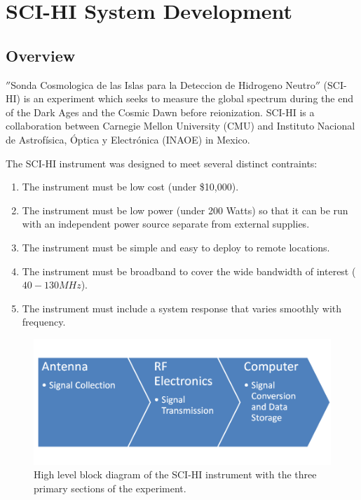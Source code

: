 \chapter{SCI-HI System Development}\label{Ch:System}



\section{Overview} \label{Sec:sysover}

$''$Sonda Cosmologica de las Islas para la Deteccion de Hidrogeno Neutro$''$ (SCI-HI) is an experiment which seeks to measure the \cm global spectrum during the end of the Dark Ages and the Cosmic Dawn before reionization. SCI-HI is a collaboration between Carnegie Mellon University (CMU) and Instituto Nacional de Astrof\'{i}sica, \'{O}ptica y Electr\'{o}nica (INAOE) in Mexico.  

The SCI-HI instrument was designed to meet several distinct contraints:

\begin{enumerate}
\item The instrument must be low cost (under \$10,000).

\item The instrument must be low power (under  200 Watts) so that it can be run with an independent power source separate from external supplies. 

\item The instrument must be simple and easy to deploy to remote locations. 

\item The instrument must be broadband to cover the wide bandwidth of interest ($40-130 MHz$).

\item The instrument must include a system response that varies smoothly with frequency. 

\end{enumerate}

\begin{figure}[bht]
\begin{center}
\includegraphics[width=0.9\linewidth]{SCIHI_system/figures/basic_block_diagram.png}
\caption{High level block diagram of the SCI-HI instrument with the three primary sections of the experiment. }
\label{Fig:basic_block_diagram}
\end{center}
\end{figure}


